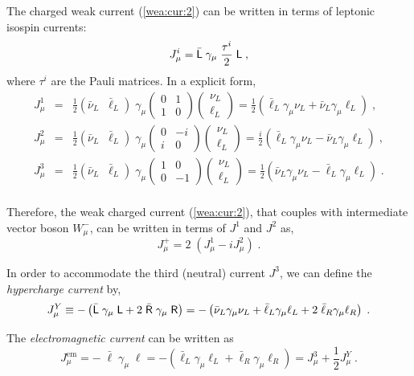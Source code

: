 \documentclass[12pt]{report}
\def\text#1{{\scriptstyle\mathrm{#1}}}
\newcommand{\g}{\gamma}
\newcommand{\ld}{\mbox{\sf L}}
\newcommand{\rs}{\mbox{\sf R}}
\newcommand{\ba}{\begin{array}}
\newcommand{\ea}{\end{array}}
\begin{document}
The charged weak current (\ref{wea:cur:2}) can be written in terms of
leptonic isospin currents: 
\[
J_\mu^i =  \bar{\ld} \; \g_\mu \; \frac{\tau^i}{2} \; \ld \; ,
\]
where $\tau^i$ are the Pauli matrices. In a explicit form,
\begin{eqnarray*}
J_\mu^1 &=& \frac{1}{2} ( \bar{\nu}_L \;\; \bar{\ell}_L) \; \g_\mu 
\left( \ba{cc}
 0 & 1 \\
 1 & 0
              \ea \right) 
\left( \ba{c}
	      		\nu_L\\
	      		\ell_L
              \ea \right) 
= \frac{1}{2} \left(\bar{\ell}_L \g_\mu \nu_L + 
                    \bar{\nu}_L \g_\mu \ell_L  
                     \right)  \; , \\
J_\mu^2 &=& \frac{1}{2} ( \bar{\nu}_L \;\; \bar{\ell}_L) \; \g_\mu 
\left( \ba{cc}
 0 & -i \\
 i & 0
              \ea \right) 
\left( \ba{c}
	      		\nu_L\\
	      		\ell_L
              \ea \right) 
= \frac{i}{2} \left( \bar{\ell}_L \g_\mu \nu_L - 
                     \bar{\nu}_L \g_\mu \ell_L   \right)  \; , \\
J_\mu^3 &=& \frac{1}{2} ( \bar{\nu}_L \;\; \bar{\ell}_L) \; \g_\mu 
\left( \ba{cc}
 1 & 0 \\
 0 & -1
              \ea \right) 
\left( \ba{c}
	      		\nu_L\\
	      		\ell_L
              \ea \right) = 
\frac{1}{2} \left( \bar{\nu}_L \g_\mu \nu_L - 
                   \bar{\ell}_L \g_\mu \ell_L  \right)  \; .\\
\end{eqnarray*}


Therefore, the weak charged current (\ref{wea:cur:2}), that couples
with intermediate vector boson $W^-_\mu$, can be written in terms of
$J^1$ and $J^2$ as,
\[
J_\mu^+ = 2 \;  \left( J_\mu^1 - i J_\mu^2\right) \; .
\]

In order to accommodate the third (neutral) current $J^3$, we can
define the {\it hypercharge current} by,
\[
J_\mu^Y \equiv - \left(  \bar{\ld} \; \g_\mu \; \ld  + 
               2 \; \bar{\rs} \; \g_\mu \; \rs \right) = 
-  \left( \bar{\nu}_L \g_\mu \nu_L +  
          \bar{\ell}_L \g_\mu \ell_L + 
          2 \; \bar{\ell}_R \g_\mu \ell_R  \right) \; .
\]

The {\it electromagnetic current} can be written as
\[
J_\mu^{\text{em}} = - \;  \bar{\ell} \; \g_\mu \; \ell  
= -  \left(\bar{\ell}_L \g_\mu \ell_L + \bar{\ell}_R \g_\mu \ell_R \right)
= J_\mu^{3} + \frac{1}{2} J_\mu^Y \; .
\]
\end{document}

